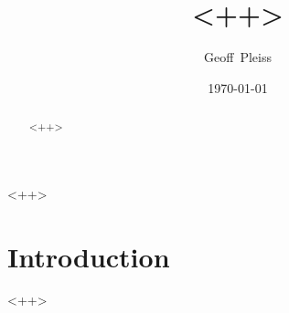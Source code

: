 \documentclass[journal]{IEEEtran}
\author{Geoff~Pleiss}
\date{\today}
\title{<++>}
\begin{document}
\maketitle

\begin{abstract}
<++>
\end{abstract}

\begin{keywords}
<++>
\end{keywords}

\section{Introduction}
<++>
\end{document}
